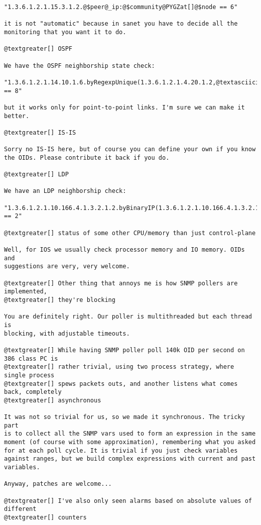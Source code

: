 \documentclass[a4wide,10pt,italian]{manual}
\begin{document}
\begin{Verbatim}[commandchars=@\[\]]
"1.3.6.1.2.1.15.3.1.2.@$peer@_ip:@$community@PYGZat[]@$node == 6"

it is not "automatic" because in sanet you have to decide all the
monitoring that you want it to do.

@textgreater[] OSPF

We have the OSPF neighborship state check:

"1.3.6.1.2.1.14.10.1.6.byRegexpUnique(1.3.6.1.2.1.4.20.1.2,@textasciicircum[]@$ifindex@$).0:@$linked@_community@PYGZat[]@$linked@_node
== 8"

but it works only for point-to-point links. I'm sure we can make it better.

@textgreater[] IS-IS

Sorry no IS-IS here, but of course you can define your own if you know
the OIDs. Please contribute it back if you do.

@textgreater[] LDP

We have an LDP neighborship check:

"1.3.6.1.2.1.10.166.4.1.3.2.1.2.byBinaryIP(1.3.6.1.2.1.10.166.4.1.3.2.1.5:@$community@PYGZat[]@$node,@$peer@_ip):@$community@PYGZat[]@$node
== 2"

@textgreater[] status of some other CPU/memory than just control-plane

Well, for IOS we usually check processor memory and IO memory. OIDs and
suggestions are very, very welcome.

@textgreater[] Other thing that annoys me is how SNMP pollers are implemented,
@textgreater[] they're blocking

You are definitely right. Our poller is multithreaded but each thread is
blocking, with adjustable timeouts.

@textgreater[] While having SNMP poller poll 140k OID per second on 386 class PC is
@textgreater[] rather trivial, using two process strategy, where single process
@textgreater[] spews packets outs, and another listens what comes back, completely
@textgreater[] asynchronous

It was not so trivial for us, so we made it synchronous. The tricky part
is to collect all the SNMP vars used to form an expression in the same
moment (of course with some approximation), remembering what you asked
for at each poll cycle. It is trivial if you just check variables
against ranges, but we build complex expressions with current and past
variables.

Anyway, patches are welcome...

@textgreater[] I've also only seen alarms based on absolute values of different
@textgreater[] counters


\end{Verbatim}
\end{document}
